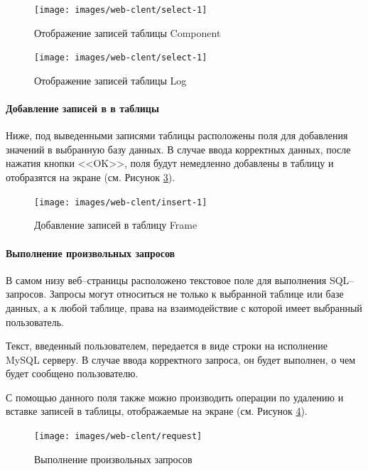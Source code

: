 \documentclass[a4paper,14pt]{extarticle}
\begin{document}
\begin{figure}[h!]
	\centering
	\texttt{[image: images/web-clent/select-1]}
	\caption{Отображение записей таблицы Component}
	\label{fig:select-1}
\end{figure}

\begin{figure}[h!]
	\centering
	\texttt{[image: images/web-clent/select-1]}
	\caption{Отображение записей таблицы Log}
	\label{fig:select-log}
\end{figure}



\paragraph{Добавление записей в в таблицы}
Ниже, под выведенными записями таблицы расположены поля для добавления значений в выбранную базу данных. В случае ввода корректных данных, после нажатия кнопки <<OK>>, поля будут немедленно добавлены в таблицу и отобразятся на экране (см. Рисунок \ref{fig:insert-1}).

\begin{figure}[h!]
	\centering
	\texttt{[image: images/web-clent/insert-1]}
	\caption{Добавление записей в таблицу Frame}
	\label{fig:insert-1}
\end{figure}


\paragraph{Выполнение произвольных запросов}
В самом низу веб--страницы расположено текстовое поле для выполнения SQL--запросов. Запросы могут относиться не только к выбранной таблице или базе данных, а к любой таблице, права на взаимодействие с которой имеет выбранный пользователь. 

Текст, введенный пользователем, передается в виде строки на исполнение MySQL серверу. В случае ввода корректного запроса, он будет выполнен, о чем будет сообщено пользователю. 

С помощью данного поля также можно производить операции по удалению и вставке записей в таблицы, отображаемые на экране (см. Рисунок \ref{fig:request}).

\begin{figure}[h!]
	\centering
	\texttt{[image: images/web-clent/request]}
	\caption{Выполнение произвольных запросов}
	\label{fig:request}
\end{figure}
 








\end{document}

